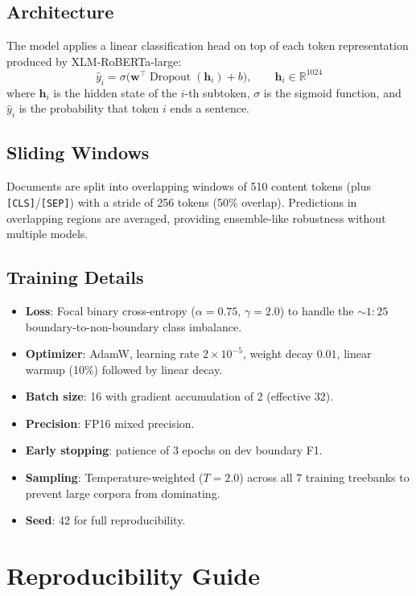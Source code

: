 \documentclass[11pt,a4paper]{article}
\begin{document}
\subsection{Architecture}

The model applies a linear classification head on top of each token representation
produced by XLM-RoBERTa-large:
%
\[
  \hat{y}_i = \sigma\!\bigl(\mathbf{w}^\top \operatorname{Dropout}(\mathbf{h}_i) + b\bigr),
  \qquad \mathbf{h}_i \in \mathbb{R}^{1024}
\]
%
where $\mathbf{h}_i$ is the hidden state of the $i$-th subtoken, $\sigma$ is the
sigmoid function, and $\hat{y}_i$ is the probability that token $i$ ends a sentence.

\subsection{Sliding Windows}

Documents are split into overlapping windows of 510 content tokens (plus
\texttt{[CLS]}/\texttt{[SEP]}) with a stride of 256 tokens (50\% overlap).
Predictions in overlapping regions are averaged, providing ensemble-like
robustness without multiple models.

\subsection{Training Details}

\begin{itemize}[nosep]
  \item \textbf{Loss}: Focal binary cross-entropy ($\alpha{=}0.75$, $\gamma{=}2.0$) to
        handle the ${\sim}1{:}25$ boundary-to-non-boundary class imbalance.
  \item \textbf{Optimizer}: AdamW, learning rate $2{\times}10^{-5}$, weight decay $0.01$,
        linear warmup (10\%) followed by linear decay.
  \item \textbf{Batch size}: 16 with gradient accumulation of 2 (effective 32).
  \item \textbf{Precision}: FP16 mixed precision.
  \item \textbf{Early stopping}: patience of 3 epochs on dev boundary F1.
  \item \textbf{Sampling}: Temperature-weighted ($T{=}2.0$) across all 7 training
        treebanks to prevent large corpora from dominating.
  \item \textbf{Seed}: 42 for full reproducibility.
\end{itemize}

\section{Reproducibility Guide}
\end{document}
